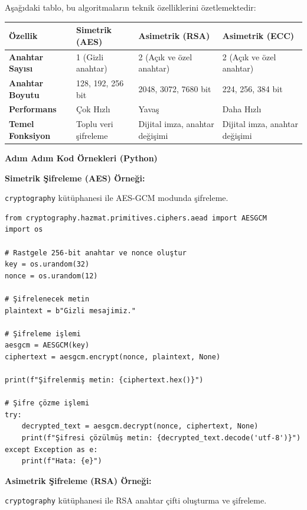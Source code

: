 Aşağıdaki tablo, bu algoritmaların teknik özelliklerini özetlemektedir:

\begin{tabular}{|p{3.5cm}|p{4cm}|p{4cm}|p{4cm}|}
\hline
\textbf{Özellik} & \textbf{Simetrik (AES)} & \textbf{Asimetrik (RSA)} & \textbf{Asimetrik (ECC)} \\
\hline
\textbf{Anahtar Sayısı} & 1 (Gizli anahtar) & 2 (Açık ve özel anahtar) & 2 (Açık ve özel anahtar) \\
\hline
\textbf{Anahtar Boyutu} & 128, 192, 256 bit & 2048, 3072, 7680 bit & 224, 256, 384 bit \\
\hline
\textbf{Performans} & Çok Hızlı & Yavaş & Daha Hızlı \\
\hline
\textbf{Temel Fonksiyon} & Toplu veri şifreleme & Dijital imza, anahtar değişimi & Dijital imza, anahtar değişimi \\
\hline
\end{tabular}

\textbf{Adım Adım Kod Örnekleri (Python)}

\textbf{Simetrik Şifreleme (AES) Örneği:}

\texttt{cryptography} kütüphanesi ile AES-GCM modunda şifreleme.

\begin{verbatim}
from cryptography.hazmat.primitives.ciphers.aead import AESGCM
import os
 
# Rastgele 256-bit anahtar ve nonce oluştur
key = os.urandom(32)
nonce = os.urandom(12)
 
# Şifrelenecek metin
plaintext = b"Gizli mesajimiz."
 
# Şifreleme işlemi
aesgcm = AESGCM(key)
ciphertext = aesgcm.encrypt(nonce, plaintext, None)
 
print(f"Şifrelenmiş metin: {ciphertext.hex()}")
 
# Şifre çözme işlemi
try:
    decrypted_text = aesgcm.decrypt(nonce, ciphertext, None)
    print(f"Şifresi çözülmüş metin: {decrypted_text.decode('utf-8')}")
except Exception as e:
    print(f"Hata: {e}")
\end{verbatim}

\textbf{Asimetrik Şifreleme (RSA) Örneği:}

\texttt{cryptography} kütüphanesi ile RSA anahtar çifti oluşturma ve şifreleme.

